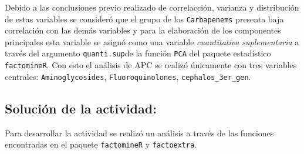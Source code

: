 \documentclass[
]{article}
\begin{document}
Debido a las conclusiones previo realizado de correlacción, varianza y
distribución de estas variables se consideró que el grupo de los
\texttt{Carbapenems} presenta baja correlación con las demás variables y
para la elaboración de los componentes principales esta variable se
asignó como una variable \emph{cuantitativa suplementaria} a través del
argumento \texttt{quanti.sup}de la función \texttt{PCA} del paquete
estadístico \texttt{factomineR}. Con esto el análisis de APC se realizó
únicamente con tres variables centrales: \texttt{Aminoglycosides},
\texttt{Fluoroquinolones}, \texttt{cephalos\_3er\_gen}.

\hypertarget{soluciuxf3n-de-la-actividad}{%
\subsection{Solución de la
actividad:}\label{soluciuxf3n-de-la-actividad}}

Para desarrollar la actividad se realizó un análisis a través de las
funciones encontradas en el paquete \texttt{factomineR} y
\texttt{factoextra}.
\end{document}
